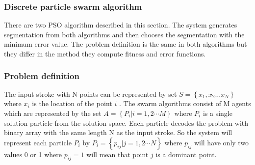 \documentclass[a4paper,10pt]{IEEEconf}
\begin{document}
\subsubsection{Discrete particle swarm algorithm}
\label{subsubsec:Discreteparticleswarmalgorithm}
There are two PSO algorithm described in this section. The system generates segmentation from both algorithms and then chooses the segmentation with the minimum error value. The problem definition is the same in both algorithms but they differ in the method they compute fitness and error functions. %
\subsubsection{Problem definition}
The input stroke with N points can be represented by set $S = \left\{ {x_1 ,x_2  \ldots x_N } \right\}$ where $x_i$ is the location of the point $i$ . The swarm algorithms consist of M agents which are represented by the set 
$A  = \left\{ {P_i \left| {i = 1,2 \cdots M} \right.} \right\}$ where $P_i$ is a single solution particle from the solution space. Each particle decodes the problem with binary array with the same length N as the input stroke.  
So the system will represent each particle $P_i$ by $P_i = \left\{ {p_{ij} \left| {j = 1,2 \cdots N} \right.} \right\}$ where $p_{ij}$ will have only two values 0 or 1 where $p_{ij}=1$ will mean that point $j$ is a dominant point. 
\end{document}
